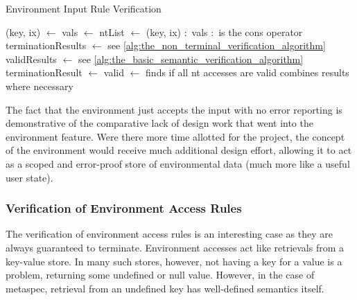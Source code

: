 \begin{breakablealgorithm}
\caption{Environment Input Rule Verification}
\label{alg:environment_input_rule_verification}
\begin{algorithmic}
    \State (key, ix) $\gets$ 
    \State vals $\gets$ 
    \State ntList $\gets$ (key, ix) $:$ vals
    \Comment $:$ is the cons operator
    \State terminationResults $\gets$ 
    \Comment see \autoref{alg:the_non_terminal_verification_algorithm}
    \State validResults $\gets$ 
    \Comment see \autoref{alg:the_basic_semantic_verification_algorithm}
    \State terminationResult $\gets$ 
    \State valid $\gets$ 
    \Comment finds if all nt accesses are valid
        \State {}
    \Else
        \State {}
    \EndIf
    \Comment combines results where necessary
\EndFunction
\end{algorithmic}
\end{breakablealgorithm}

The fact that the environment just accepts the input with no error reporting is demonstrative of the comparative lack of design work that went into the environment feature. 
Were there more time allotted for the project, the concept of the environment would receive much additional design effort, allowing it to act as a scoped and error-proof store of environmental data (much more like a useful user state). 


\subsubsection{Verification of Environment Access Rules} %
\label{ssub:verification_of_environment_access_rules}
The verification of environment access rules is an interesting case as they are always guaranteed to terminate. 
Environment accesses act like retrievals from a key-value store.
In many such stores, however, not having a key for a value is a problem, returning some undefined or null value.
However, in the case of \gls{metaspec}, retrieval from an undefined key has well-defined semantics itself.\\

